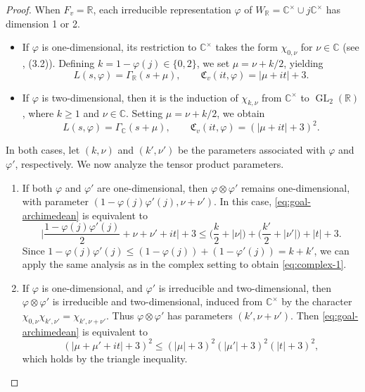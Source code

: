 \documentclass[12pt,reqno]{amsart}
\theoremstyle{remark}
\DeclareMathOperator{\GL}{GL}
\newcommand{\R}{\mathbb{R}}
\numberwithin{equation}{section}
\begin{document}
\begin{appendices}
\begin{proof}
    When $F_v = \mathbb{R}$, each irreducible representation $\varphi$ of $W_{\R} = \mathbb{C}^{\times} \cup j\mathbb{C}^{\times}$ has dimension 1 or 2. 
    \begin{itemize}
        \item If $\varphi$ is one-dimensional, its restriction to $\mathbb{C}^{\times}$  takes the form $\chi_{0,\nu}$ for $\nu \in \mathbb{C}$ (see \cite{Knapp}, (3.2)). Defining $k =1 -\varphi(j) \in \{0,2\}$, we set $\mu = \nu + k/2$, yielding 
        \[
        L(s, \varphi) = \Gamma_{\mathbb{R}}(s+\mu), \qquad \mathfrak{C}_{v}(it, \varphi) = |\mu+it|+3.
        \]
        \item  If $\varphi$ is two-dimensional, then it is the induction of $\chi_{k,\nu}$ from  $\mathbb{C}^{\times}$ to $\GL_2(\mathbb{R})$, where $k \ge 1$ and $\nu \in \mathbb{C}$. Setting $\mu =\nu  + k/2$, we obtain 
        \[
        L(s, \varphi) = \Gamma_{\mathbb{C}}(s+\mu), \qquad \mathfrak{C}_v(it, \varphi) = (|\mu+it|+3)^2.
        \]
    \end{itemize}
      In both cases, let $(k,\nu)$ and $(k',\nu')$ be the parameters associated with $\varphi$ and $\varphi'$, respectively. We now analyze the  tensor product %
      parameters.
    \begin{enumerate}
        \item If both  $\varphi$ and $\varphi'$ are one-dimensional, then $\varphi \otimes \varphi'$ remains one-dimensional, with parameter $(1-\varphi(j)\varphi'(j), \nu+\nu')$. In this case, \eqref{eq:goal-archimedean} is equivalent to \begin{equation}\label{eq:complex-1}
        \Big|\frac{1-\varphi(j)\varphi'(j)}{2}+\nu+\nu'+it\Big|+3 \le  \Big( \frac{k}{2} +|\nu|\Big) + \Big( \frac{k'}{2} +|\nu'|\Big)+|t| +3.
        \end{equation}
        Since $1-\varphi(j)\varphi'(j) \le (1-\varphi(j))+(1-\varphi'(j)) = k+k'$, we 
        can apply the same analysis as in the complex setting to obtain \eqref{eq:complex-1}.
        \item If $\varphi$ is one-dimensional, and $\varphi'$ is irreducible and two-dimensional, then $\varphi \otimes \varphi'$ is irreducible and two-dimensional, induced from $\mathbb{C}^{\times}$ by the character $\chi_{0,\nu}\chi_{k',\nu'}=\chi_{k',\nu+\nu'}$. Thus $\varphi \otimes \varphi'$ has parameters $(k', \nu +\nu')$. Then \eqref{eq:goal-archimedean} is equivalent to
        \[
        (|\mu+\mu'+it|+3)^2 \le (|\mu|+3)^2(|\mu'|+3)^2(|t|+3)^2,
        \]
        which holds by the triangle inequality.

\end{enumerate}
\end{proof}
\end{appendices}
\end{document}
